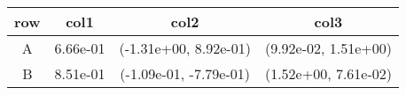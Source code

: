 \begin{tabular}{cccc}
\toprule
row&col1&col2&col3\tabularnewline
\midrule
A&6.66e-01& (-1.31e+00, 8.92e-01)& (9.92e-02, 1.51e+00)\tabularnewline
B&8.51e-01& (-1.09e-01, -7.79e-01)& (1.52e+00, 7.61e-02)\tabularnewline
\bottomrule
\end{tabular}
